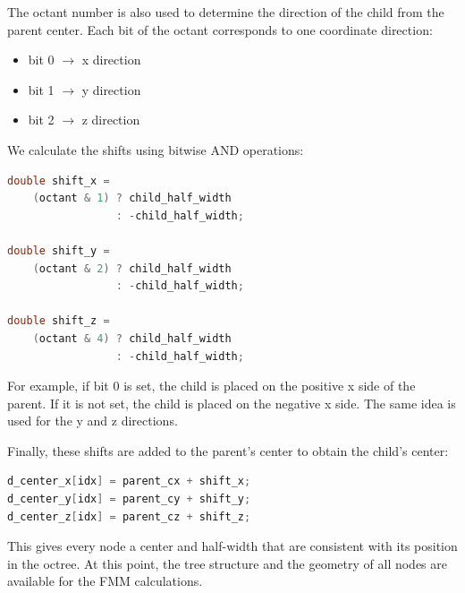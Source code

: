 The octant number is also used to determine the direction of the child from the parent center. Each bit of the octant corresponds to one coordinate direction:

\begin{itemize}
    \item bit 0 $\rightarrow$ x direction
    \item bit 1 $\rightarrow$ y direction
    \item bit 2 $\rightarrow$ z direction
\end{itemize}

We calculate the shifts using bitwise AND operations:

\begin{lstlisting}[language=C]
double shift_x =
    (octant & 1) ? child_half_width
                 : -child_half_width;

double shift_y =
    (octant & 2) ? child_half_width
                 : -child_half_width;

double shift_z =
    (octant & 4) ? child_half_width
                 : -child_half_width;
\end{lstlisting}

For example, if bit 0 is set, the child is placed on the positive x side of the parent. If it is not set, the child is placed on the negative x side. The same idea is used for the y and z directions.

Finally, these shifts are added to the parent's center to obtain the child's center:

\begin{lstlisting}[language=C]
d_center_x[idx] = parent_cx + shift_x;
d_center_y[idx] = parent_cy + shift_y;
d_center_z[idx] = parent_cz + shift_z;
\end{lstlisting}

This gives every node a center and half-width that are consistent with its position in the octree. At this point, the tree structure and the geometry of all nodes are available for the FMM calculations.
